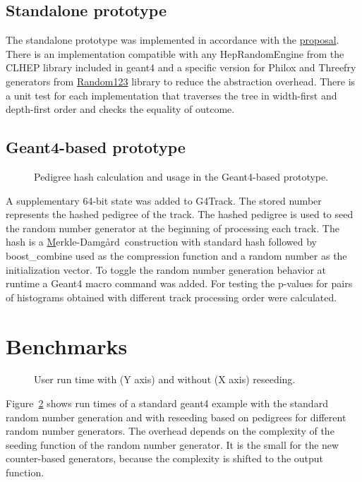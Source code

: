 \documentclass[a4paper, 12pt]{article} %
\newcommand{\MD}{Merkle-Damg\r{a}rd}
\begin{document}
  \subsection*{ Standalone prototype }
   The standalone prototype was implemented in accordance with the \href{https://sd57.github.io/g4dprng/gsoc-proposal-Savin.html}{proposal}.
   There is an implementation compatible with any HepRandomEngine from the CLHEP library included in geant4
   and a specific version for Philox and Threefry generators from
   \href{https://www.deshawresearch.com/resources_random123.html}{Random123} library
   to reduce the abstraction overhead.
   There is a unit test for each implementation that traverses the tree in width-first and depth-first order and checks the equality of outcome.

   \subsection*{ Geant4-based prototype }
   
  \begin{figure}
   \scalebox{.5}{}
   \label{MD}
   \caption{Pedigree hash calculation and usage in the Geant4-based prototype.}
  \end{figure}
  A supplementary 64-bit state was added to G4Track.
  The stored number represents the hashed pedigree of the track.
  The hashed pedigree is used to seed the random number generator at the beginning of processing each track.
  The hash is a \href{https://en.wikipedia.org/wiki/Merkle\%E2\%80\%93Damg\%C3\%A5rd\_construction}\MD\ construction with standard hash followed by boost\_combine used as the compression function and a random number as the initialization vector.
  To toggle the random number generation behavior at runtime a Geant4 macro command was added.
  For testing the p-values for pairs of histograms obtained with different track processing order were calculated.
  
 \section*{ Benchmarks }
  \begin{figure}
   \scalebox{.8}{}
   \label{USERTIME}
   \caption{User run time with (Y axis) and without (X axis) reseeding.}
  \end{figure}
  
  Figure~\ref{USERTIME} shows run times of a standard geant4 example with the standard random number generation and with reseeding based on pedigrees for different random number generators.
  The overhead depends on the complexity of the seeding function of the random number generator.
  It is the small for the new counter-based generators,
  because the complexity is shifted to the output function.
    
\end{document}
